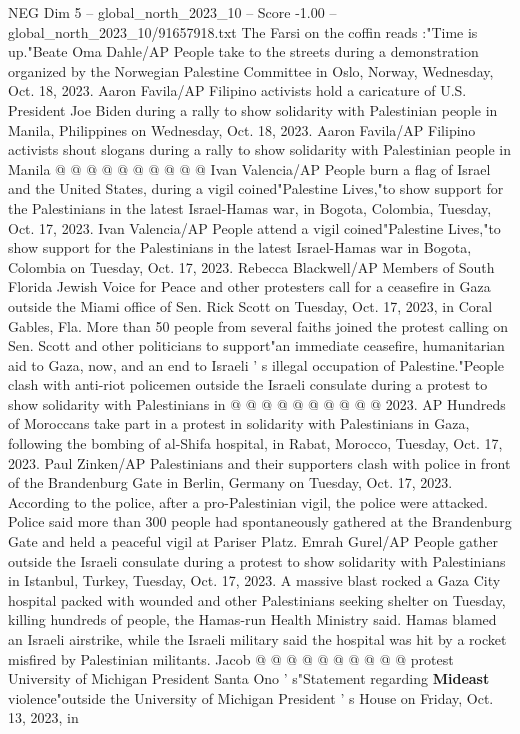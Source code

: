 \begin{textsample}{NEG Dim 5 – global\_north\_2023\_10 – Score -1.00 – global\_north\_2023\_10/91657918.txt}
The Farsi on the coffin reads :"Time is up."Beate Oma Dahle/AP People take to the streets during a demonstration organized by the Norwegian Palestine Committee in Oslo, Norway, Wednesday, Oct. 18, 2023.
Aaron Favila/AP Filipino activists hold a caricature of U.S.
President Joe Biden during a rally to show solidarity with Palestinian people in Manila, Philippines on Wednesday, Oct. 18, 2023.
Aaron Favila/AP Filipino activists shout slogans during a rally to show solidarity with Palestinian people in Manila @ @ @ @ @ @ @ @ @ @ Ivan Valencia/AP People burn a flag of Israel and the United States, during a vigil coined"Palestine Lives,"to show support for the Palestinians in the latest Israel-Hamas war, in Bogota, Colombia, Tuesday, Oct. 17, 2023.
Ivan Valencia/AP People attend a vigil coined"Palestine Lives,"to show support for the Palestinians in the latest Israel-Hamas war in Bogota, Colombia on Tuesday, Oct. 17, 2023.
Rebecca Blackwell/AP Members of South Florida Jewish Voice for Peace and other protesters call for a ceasefire in Gaza outside the Miami office of Sen.
Rick Scott on Tuesday, Oct. 17, 2023, in Coral Gables, Fla.
More than 50 people from several faiths joined the protest calling on Sen.
Scott and other politicians to support"an immediate ceasefire, humanitarian aid to Gaza, now, and an end to Israeli ' s illegal occupation of Palestine."People clash with anti-riot policemen outside the Israeli consulate during a protest to show solidarity with Palestinians in @ @ @ @ @ @ @ @ @ @ 2023.
AP Hundreds of Moroccans take part in a protest in solidarity with Palestinians in Gaza, following the bombing of al-Shifa hospital, in Rabat, Morocco, Tuesday, Oct. 17, 2023.
Paul Zinken/AP Palestinians and their supporters clash with police in front of the Brandenburg Gate in Berlin, Germany on Tuesday, Oct. 17, 2023.
According to the police, after a pro-Palestinian vigil, the police were attacked.
Police said more than 300 people had spontaneously gathered at the Brandenburg Gate and held a peaceful vigil at Pariser Platz.
Emrah Gurel/AP People gather outside the Israeli consulate during a protest to show solidarity with Palestinians in Istanbul, Turkey, Tuesday, Oct. 17, 2023.
A massive blast rocked a Gaza City hospital packed with wounded and other Palestinians seeking shelter on Tuesday, killing hundreds of people, the Hamas-run Health Ministry said.
Hamas blamed an Israeli airstrike, while the Israeli military said the hospital was hit by a rocket misfired by Palestinian militants.
Jacob @ @ @ @ @ @ @ @ @ @ protest University of Michigan President Santa Ono ' s"Statement regarding \textbf{Mideast} violence"outside the University of Michigan President ' s House on Friday, Oct. 13, 2023, in

\end{textsample}
